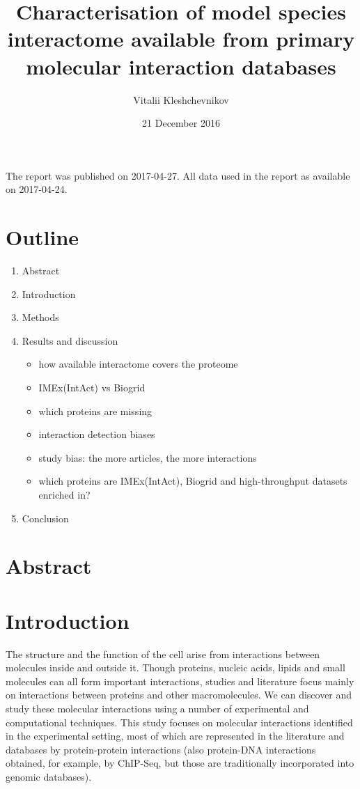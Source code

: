 \documentclass[]{article}
\title{Characterisation of model species interactome available from primary
molecular interaction databases}
\author{Vitalii Kleshchevnikov}
\date{21 December 2016}
\providecommand{\tightlist}{%
  \setlength{\itemsep}{0pt}\setlength{\parskip}{0pt}}
\begin{document}
\maketitle

{
\setcounter{tocdepth}{2}
\tableofcontents
}
The report was published on 2017-04-27. All data used in the report as
available on 2017-04-24.

\section{Outline}\label{outline}

\begin{enumerate}
\def\labelenumi{\arabic{enumi}.}
\tightlist
\item
  Abstract
\item
  Introduction
\item
  Methods
\item
  Results and discussion

  \begin{itemize}
  \tightlist
  \item
    how available interactome covers the proteome
  \item
    IMEx(IntAct) vs Biogrid
  \item
    which proteins are missing
  \item
    interaction detection biases
  \item
    study bias: the more articles, the more interactions
  \item
    which proteins are IMEx(IntAct), Biogrid and high-throughput
    datasets enriched in?
  \end{itemize}
\item
  Conclusion
\end{enumerate}

\section{Abstract}\label{abstract}

\section{Introduction}\label{introduction}

The structure and the function of the cell arise from interactions
between molecules inside and outside it. Though proteins, nucleic acids,
lipids and small molecules can all form important interactions, studies
and literature focus mainly on interactions between proteins and other
macromolecules. We can discover and study these molecular interactions
using a number of experimental and computational techniques. This study
focuses on molecular interactions identified in the experimental
setting, most of which are represented in the literature and databases
by protein-protein interactions (also protein-DNA interactions obtained,
for example, by ChIP-Seq, but those are traditionally incorporated into
genomic databases).
\end{document}
